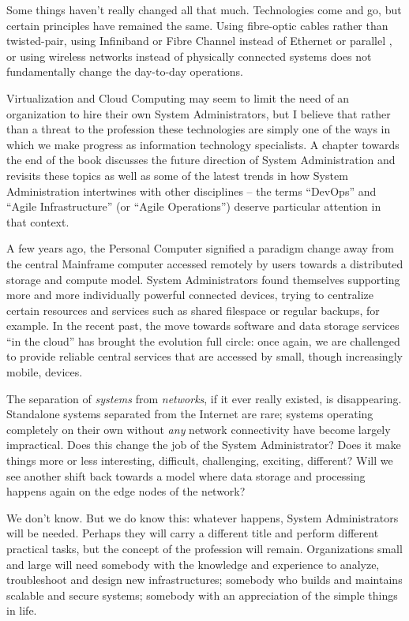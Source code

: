 Some things haven't really changed all that much.
Technologies come and go, but certain principles have
remained the same.  Using fibre-optic cables rather
than twisted-pair, using Infiniband or Fibre Channel
instead of Ethernet or parallel , or
using wireless networks instead of physically
connected systems does not fundamentally change the
day-to-day operations.

Virtualization and Cloud
Computing may seem to limit the
need of an organization to hire their own System
Administrators, but I believe that rather than a
threat to the profession these technologies are simply
one of the ways in which we make progress as
information technology specialists.  A chapter towards
the end of the book discusses the future direction of
System Administration and revisits these topics as
well as some of the latest trends in how System
Administration intertwines with other disciplines --
the terms ``DevOps'' and ``Agile
Infrastructure'' (or ``Agile Operations'') deserve
particular attention in that context.

A few years ago, the Personal Computer signified a
paradigm change away from the central Mainframe
computer accessed remotely by users towards a
distributed storage and compute model.  System
Administrators found themselves supporting more and
more individually powerful connected devices, trying
to centralize certain resources and services such as
shared filespace or regular backups, for example.  In
the recent past, the move towards software and data
storage services ``in the cloud'' has brought the
evolution full circle:  once again, we are challenged
to provide reliable central services that are accessed
by small, though increasingly mobile, devices.

The separation of {\em systems} from {\em networks},
if it ever really existed, is disappearing.
Standalone systems separated from the Internet are
rare; systems operating completely on their own
without {\em any} network connectivity have become
largely impractical.  Does this change the job of the
System Administrator?  Does it make things more or
less interesting, difficult, challenging, exciting,
different?  Will we see another shift back towards a
model where data storage and processing happens again
on the edge nodes of the network?

We don't know.  But we do know this: whatever happens,
System Administrators will be needed.  Perhaps they
will carry a different title and perform different
practical tasks, but the concept of the profession
will remain.  Organizations small and large will need
somebody with the knowledge and experience to analyze,
troubleshoot and design new infrastructures; somebody
who builds and maintains scalable and secure systems;
somebody with an appreciation of the simple things in
life.

